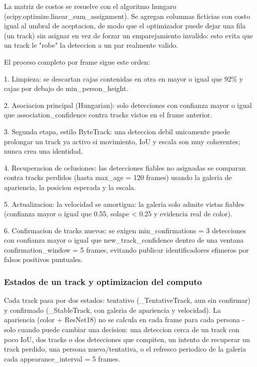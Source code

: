 \documentclass[12pt,letterpaper]{article}
\begin{document}
La matriz de costos se resuelve con el algoritmo hungaro (scipy.optimize.linear\_sum\_assignment). Se agregan columnas ficticias con costo igual al umbral de aceptacion, de modo que el optimizador puede dejar una fila (un track) sin asignar en vez de forzar un emparejamiento invalido: esto evita que un track le "robe" la deteccion a un par realmente valido.


El proceso completo por frame sigue este orden:


1. Limpieza: se descartan cajas contenidas en otra en  mayor o igual que  92\% y cajas por debajo de min\_person\_height.


2. Asociacion principal (Hungarian): solo detecciones con confianza  mayor o igual que  association\_confidence contra tracks vistos en el frame anterior.


3. Segunda etapa, estilo ByteTrack: una deteccion debil unicamente puede prolongar un track ya activo si movimiento, IoU y escala son muy coherentes; nunca crea una identidad.


4. Recuperacion de oclusiones: las detecciones fiables no asignadas se comparan contra tracks perdidos (hasta max\_age = 120 frames) usando la galeria de apariencia, la posicion esperada y la escala.


5. Actualizacion: la velocidad se amortigua: la galeria solo admite vistas fiables (confianza  mayor o igual que  0.55, solape < 0.25 y evidencia real de color).


6. Confirmacion de tracks nuevos: se exigen min\_confirmations = 3 detecciones con confianza  mayor o igual que  new\_track\_confidence dentro de una ventana confirmation\_window = 5 frames, evitando publicar identificadores efimeros por falsos positivos puntuales.


\subsubsection{Estados de un track y optimizacion del computo}

Cada track pasa por dos estados: tentativo (\_TentativeTrack, aun sin confirmar) y confirmado (\_StableTrack, con galeria de apariencia y velocidad). La apariencia (color + ResNet18) no se calcula en cada frame para cada persona -solo cuando puede cambiar una decision: una deteccion cerca de un track con poco IoU, dos tracks o dos detecciones que compiten, un intento de recuperar un track perdido, una persona nueva/tentativa, o el refresco periodico de la galeria cada appearance\_interval = 5 frames.
\end{document}
